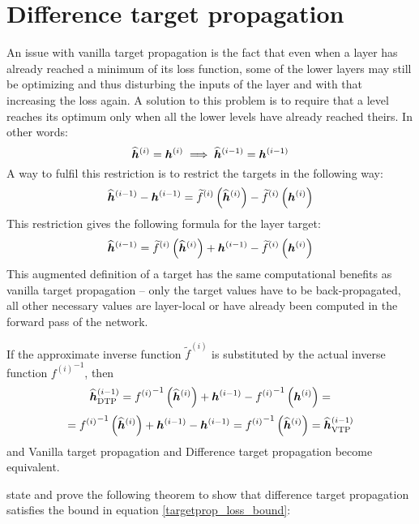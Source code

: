 \section{Difference target propagation}

An issue with vanilla target propagation is the fact that even when a layer has already reached a minimum of its loss function, some of the lower layers may still be optimizing and thus disturbing the inputs of the layer and with that increasing the loss again. A solution to this problem is to require that a level reaches its optimum only when all the lower levels have already reached theirs. In other words:
\[ \widehat{\bm{h}}^{(i)} = \bm{h}^{(i)} \implies \widehat{\bm{h}}^{(i - 1)} = \bm{h}^{(i - 1)} \]
A way to fulfil this restriction is to restrict the targets in the following way:
\[ \widehat{\bm{h}}^{(i - 1)} - \bm{h}^{(i - 1)} = \widetilde{f}^{(i)} \left( \widehat{\bm{h}}^{(i)} \right) - \widetilde{f}^{(i)} \left( \bm{h}^{(i)} \right) \]
This restriction gives the following formula for the layer target:
\begin{equation}\label{difference_targetprop}
	\widehat{\bm{h}}^{(i - 1)} = \widetilde{f}^{(i)} \left( \widehat{\bm{h}}^{(i)} \right) + \bm{h}^{(i - 1)} - \widetilde{f}^{(i)} \left( \bm{h}^{(i)} \right)
\end{equation}
This augmented definition of a target has the same computational benefits as vanilla target propagation -- only the target values have to be back-propagated, all other necessary values are layer-local or have already been computed in the forward pass of the network.

\begin{remark}
	If the approximate inverse function \( \widetilde{f}^{(i)} \) is substituted by the actual inverse function \( {f^{(i)}}^{-1} \), then
	\[ \widehat{\bm{h}}_{\mathrm{DTP}}^{(i - 1)} = {f^{(i)}}^{-1} \left( \widehat{\bm{h}}^{(i)} \right) + \bm{h}^{(i - 1)} - {f^{(i)}}^{-1} \left( \bm{h}^{(i)} \right) = \]
	\[ = {f^{(i)}}^{-1} \left( \widehat{\bm{h}}^{(i)} \right) + \bm{h}^{(i - 1)} - \bm{h}^{(i - 1)} = {f^{(i)}}^{-1} \left( \widehat{\bm{h}}^{(i)} \right) = \widehat{\bm{h}}_{\mathrm{VTP}}^{(i - 1)} \]
	and Vanilla target propagation and Difference target propagation become equivalent.
\end{remark}

\cite{lee_difference_2015} state and prove the following theorem to show that difference target propagation satisfies the bound in equation \ref{targetprop_loss_bound}:

